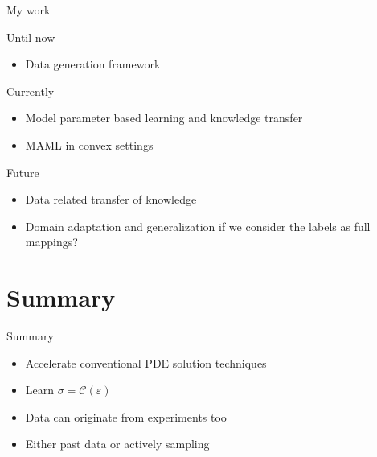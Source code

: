 \begin{frame}{My work}
\centering
\begin{block}{\color{White} Until now}
  \begin{itemize}
    \item Data generation framework
  \end{itemize}
\end{block}
\begin{block}{\color{White} Currently}
  \begin{itemize}
    \item Model parameter based learning and knowledge transfer 
    \item MAML in convex settings
  \end{itemize}
\end{block}
\begin{block}{\color{White} Future}
  \begin{itemize}
    \item Data related transfer of knowledge 
    \item Domain adaptation and generalization if we consider the labels as full mappings?
  \end{itemize}
\end{block}
\end{frame}

\section{Summary}
\begin{frame}{Summary}
  \begin{itemize}
    \item Accelerate conventional PDE solution techniques
    \item Learn $\sigma=\mathcal{C}(\varepsilon)$ 
    \item Data can originate from experiments too
    \item Either past data or actively sampling
  \end{itemize}
\end{frame}

